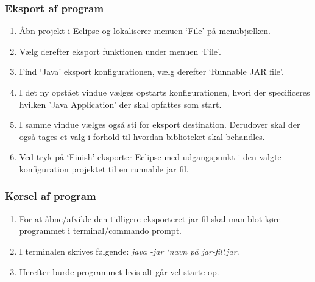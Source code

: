 \subsubsection{Eksport af program}
\begin{enumerate}   
    \item Åbn projekt i Eclipse og lokaliserer menuen ‘File’ på menubjælken.
    \item Vælg derefter eksport funktionen under menuen ‘File’.
    \item Find ‘Java’ eksport konfigurationen, vælg derefter ‘Runnable JAR file’.
    \item I det ny opstået vindue vælges opstarts konfigurationen, hvori der specificeres hvilken ’Java Application’ der skal opfattes som start.
    \item I samme vindue vælges også sti for eksport destination. Derudover skal der også tages et valg i forhold til hvordan biblioteket skal behandles. 
    \item Ved tryk på ‘Finish’ eksporter Eclipse med udgangspunkt i den valgte konfiguration projektet til en runnable jar fil.\\
\end{enumerate}

\subsubsection{Kørsel af program}
\begin{enumerate}   
    \item For at åbne/afvikle den tidligere eksporteret jar fil skal man blot køre programmet i terminal/commando prompt.
    \item I terminalen skrives følgende: \textit{java -jar ‘navn på jar-fil‘.jar}.
    \item Herefter burde programmet hvis alt går vel starte op.\\    
\end{enumerate}